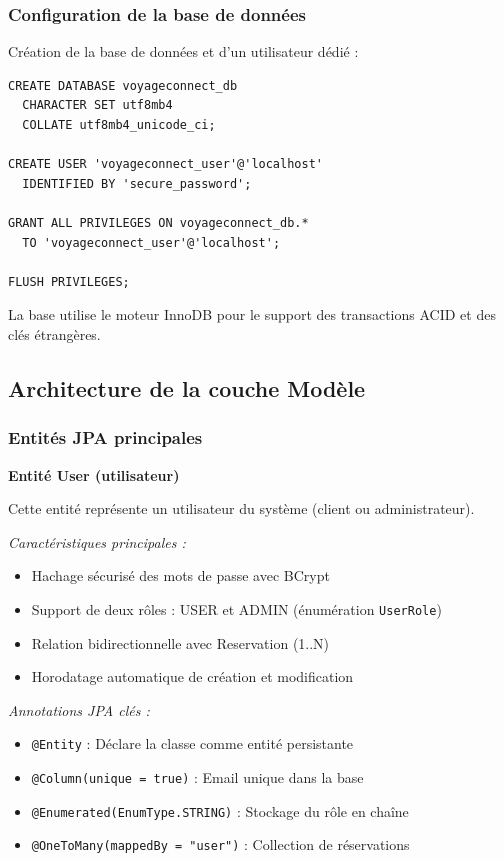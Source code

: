 \documentclass[12pt,a4paper]{report}
\begin{document}
\subsubsection{Configuration de la base de données}

Création de la base de données et d'un utilisateur dédié :

\begin{verbatim}
CREATE DATABASE voyageconnect_db 
  CHARACTER SET utf8mb4 
  COLLATE utf8mb4_unicode_ci;

CREATE USER 'voyageconnect_user'@'localhost' 
  IDENTIFIED BY 'secure_password';

GRANT ALL PRIVILEGES ON voyageconnect_db.* 
  TO 'voyageconnect_user'@'localhost';

FLUSH PRIVILEGES;
\end{verbatim}

La base utilise le moteur InnoDB pour le support des transactions ACID et des clés étrangères.

\subsection{Architecture de la couche Modèle}

\subsubsection{Entités JPA principales}

\textbf{Entité User (utilisateur)}

Cette entité représente un utilisateur du système (client ou administrateur).

\textit{Caractéristiques principales :}
\begin{itemize}
    \item Hachage sécurisé des mots de passe avec BCrypt
    \item Support de deux rôles : USER et ADMIN (énumération \texttt{UserRole})
    \item Relation bidirectionnelle avec Reservation (1..N)
    \item Horodatage automatique de création et modification
\end{itemize}

\textit{Annotations JPA clés :}
\begin{itemize}
    \item \texttt{@Entity} : Déclare la classe comme entité persistante
    \item \texttt{@Column(unique = true)} : Email unique dans la base
    \item \texttt{@Enumerated(EnumType.STRING)} : Stockage du rôle en chaîne
    \item \texttt{@OneToMany(mappedBy = "user")} : Collection de réservations
\end{itemize}
\end{document}
